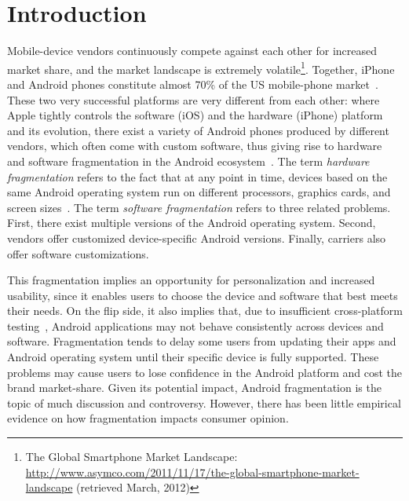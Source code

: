 \documentclass[10pt, conference, compsocconf]{IEEEtran}
\begin{document}
\section{Introduction}

Mobile-device vendors continuously compete against each other for
increased market share, and the market landscape is extremely
volatile\footnote{The Global Smartphone Market Landscape:
  \url{http://www.asymco.com/2011/11/17/the-global-smartphone-market-landscape}
  (retrieved March, 2012)}. Together, iPhone and Android phones
constitute almost 70\% of the US mobile-phone market~\cite{usmarket}. 
These two very successful platforms are very
different from each other: where Apple tightly controls the software
(iOS) and the hardware (iPhone) platform and its evolution, there
exist a variety of Android phones produced by different vendors, which
often come with custom software, thus giving rise to hardware and
software fragmentation in the Android ecosystem~\cite{analysis}. The
term {\em hardware fragmentation} refers to the fact that at any point
in time, devices based on the same Android operating system run on
different processors, graphics cards, and screen
sizes~\cite{analysis}. 
The term {\em software fragmentation} refers to three
related problems. First, there exist multiple versions of the Android
operating system. Second, vendors offer customized device-specific
Android versions. Finally, carriers also offer software
customizations.

This fragmentation implies an opportunity for personalization and
increased usability, since it enables users to choose the device and
software that best meets their needs. On the flip side, it also
implies that, due to insufficient cross-platform
testing~\cite{testing}, Android applications may not behave
consistently across devices and software.  
Fragmentation tends to delay some users from updating their apps
and Android operating system until their specific device is fully supported.
These problems
may cause users to lose confidence in the Android platform and cost
the brand market-share. Given its potential impact, Android
fragmentation is the topic of much discussion and
controversy. However, there has been little empirical evidence on how
fragmentation impacts consumer opinion.
\end{document}
